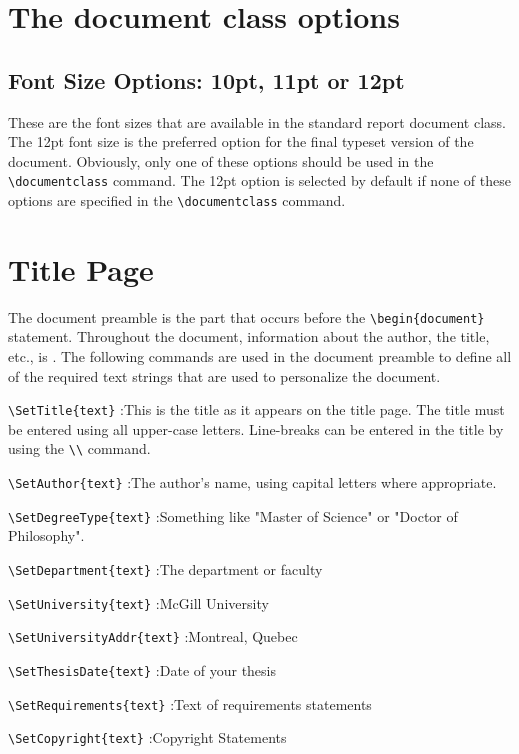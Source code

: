 \documentclass[12pt,Bold,letterpaper,TexShade]{mcgilletdclass}
\begin{document}
\chapter{The document class options}
\section{Font Size Options: 10pt, 11pt or 12pt}
These are the font sizes that are available in the standard \LaTeXe report 
document class. The 12pt font size is the preferred option for the final 
typeset version of the document. Obviously, only one of these options should 
be used in the \verb=\documentclass= command. The 12pt option is selected by default 
if none of these options are specified in
the \verb=\documentclass= command.


\chapter{Title Page}
The document preamble is the part that occurs before the \verb=\begin{document}=
statement. Throughout the document, information about the author,
the title, etc., is . The following commands are used in
the document preamble to define all of the required text strings that
are used to personalize the document.
\begin{BulletList}
	\item{\verb=\SetTitle{text}= :This is the title as it appears on the 
title page. The title must be entered using
all upper-case letters. Line-breaks can be entered in the title by
using the \verb=\\= command.}
	\item{\verb=\SetAuthor{text}= :The author's name, using capital letters 
where appropriate.}
	\item{\verb=\SetDegreeType{text}= :Something like "Master of Science" or 
"Doctor of Philosophy".}
	\item{\verb=\SetDepartment{text}= :The department or faculty }
	\item{\verb=\SetUniversity{text}= :McGill University }
	\item{\verb=\SetUniversityAddr{text}= :Montreal, Quebec}
	\item{\verb=\SetThesisDate{text}= :Date of your thesis}%
	\item{\verb=\SetRequirements{text}= :Text of requirements statements }%
	\item{\verb=\SetCopyright{text}= :Copyright Statements}%
\end{BulletList}
\end{document}

